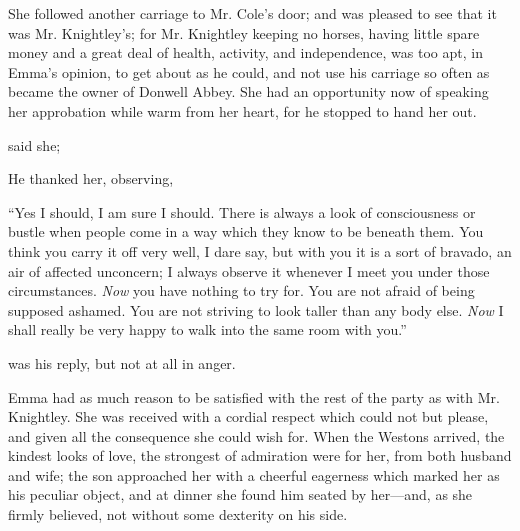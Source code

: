 She followed another carriage to Mr. Cole's door; and was pleased to see that it was Mr. Knightley's; for Mr. Knightley keeping no horses, having little spare money and a great deal of health, activity, and independence, was too apt, in Emma's opinion, to get about as he could, and not use his carriage so often as became the owner of Donwell Abbey. She had an opportunity now of speaking her approbation while warm from her heart, for he stopped to hand her out.

 said she; 

He thanked her, observing, 

“Yes I should, I am sure I should. There is always a look of consciousness or bustle when people come in a way which they know to be beneath them. You think you carry it off very well, I dare say, but with you it is a sort of bravado, an air of affected unconcern; I always observe it whenever I meet you under those circumstances. {\em Now} you have nothing to try for. You are not afraid of being supposed ashamed. You are not striving to look taller than any body else. {\em Now} I shall really be very happy to walk into the same room with you.”

 was his reply, but not at all in anger.

Emma had as much reason to be satisfied with the rest of the party as with Mr. Knightley. She was received with a cordial respect which could not but please, and given all the consequence she could wish for. When the Westons arrived, the kindest looks of love, the strongest of admiration were for her, from both husband and wife; the son approached her with a cheerful eagerness which marked her as his peculiar object, and at dinner she found him seated by her---and, as she firmly believed, not without some dexterity on his side.

